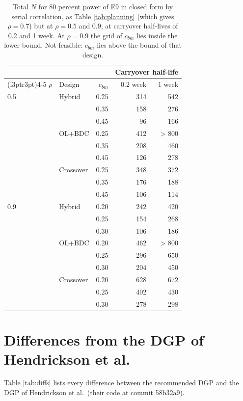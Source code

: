 \documentclass[
  11pt,
]{article}
\begin{document}
\begin{table}

\caption{\label{tab:planningrho}Total $N$ for 80 percent power of E9 in closed form by serial correlation, as Table \ref{tab:planning} (which gives $\rho = 0.7$) but at $\rho = 0.5$ and 0.9, at carryover half-lives of 0.2 and 1 week. At $\rho = 0.9$ the grid of $c_{bm}$ lies inside the lower bound. Not feasible: $c_{bm}$ lies above the bound of that design.}
\centering
\begin{tabular}[t]{llrrr}
\toprule
\multicolumn{3}{c}{ } & \multicolumn{2}{c}{Carryover half-life} \\
\cmidrule(l{3pt}r{3pt}){4-5}
$\rho$ & Design & $c_{bm}$ & 0.2 week & 1 week\\
\midrule
0.5 & Hybrid & 0.25 & 314 & 542\\
 &  & 0.35 & 158 & 276\\
 &  & 0.45 & 96 & 166\\
 & OL+BDC & 0.25 & 412 & > 800\\
 &  & 0.35 & 208 & 460\\
 &  & 0.45 & 126 & 278\\
 & Crossover & 0.25 & 348 & 372\\
 &  & 0.35 & 176 & 188\\
 &  & 0.45 & 106 & 114\\
0.9 & Hybrid & 0.20 & 242 & 420\\
 &  & 0.25 & 154 & 268\\
 &  & 0.30 & 106 & 186\\
 & OL+BDC & 0.20 & 462 & > 800\\
 &  & 0.25 & 296 & 650\\
 &  & 0.30 & 204 & 450\\
 & Crossover & 0.20 & 628 & 672\\
 &  & 0.25 & 402 & 430\\
 &  & 0.30 & 278 & 298\\
\bottomrule
\end{tabular}
\end{table}

\section{Differences from the DGP of Hendrickson et al.}\label{differences-from-the-dgp-of-hendrickson-et-al.}

Table \ref{tab:diffs} lists every difference between the recommended
DGP and the DGP of Hendrickson et al.~(their code at commit 58b32a9).
\end{document}
